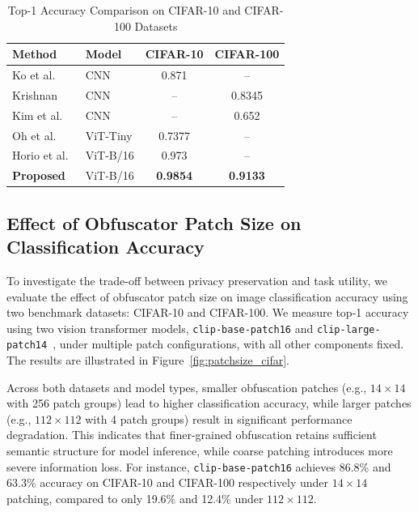 \documentclass{ieeeaccess}
\newcommand{\rev}[1]{{\color{black}#1}}
\begin{document}
\begin{table}[t!]
\centering
\caption{Top-1 Accuracy Comparison on CIFAR-10 and CIFAR-100 Datasets}
\label{tab:accuracy-comparison}
\begin{tabular}{l l c c}
\toprule
\textbf{Method} & \textbf{Model} & \textbf{CIFAR-10} & \textbf{CIFAR-100} \\
\midrule
Ko et al.~\cite{9129656}       & CNN           & 0.871   & --      \\
Krishnan~\cite{10.1007/978-3-031-37586-6_18}        & CNN           & --      & 0.8345  \\
Kim et al.~\cite{s24103166}      & CNN           & --      & 0.652   \\
Oh et al.~\cite{oh2022differentially}       & ViT-Tiny      & 0.7377  & --      \\
Horio et al.~\cite{horio2024privacypreservingvisiontransformerusing} & ViT-B/16      & 0.973   & --      \\
\rev{\textbf{Proposed}} & \rev{ViT-B/16}    & \rev{\textbf{0.9854}} & \rev{\textbf{0.9133}} \\
\bottomrule
\end{tabular}
\end{table}

\subsection{Effect of Obfuscator Patch Size on Classification Accuracy}
\label{sec:eval:patchsize}

To investigate the trade-off between privacy preservation and task utility, we evaluate the effect of obfuscator patch size on image classification accuracy using two benchmark datasets: CIFAR-10 and CIFAR-100. We measure top-1 accuracy using two vision transformer models, \texttt{clip-base-patch16} and \texttt{clip-large-patch14}~\cite{radford2021learningtransferablevisualmodels}, under multiple patch configurations, with all other components fixed. The results are illustrated in Figure~\ref{fig:patchsize_cifar}.

Across both datasets and model types, smaller obfuscation patches (e.g., $14\times14$ with 256 patch groups) lead to higher classification accuracy, while larger patches (e.g., $112\times112$ with 4 patch groups) result in significant performance degradation. This indicates that finer-grained obfuscation retains sufficient semantic structure for model inference, while coarse patching introduces more severe information loss. For instance, \texttt{clip-base-patch16} achieves 86.8\% and 63.3\% accuracy on CIFAR-10 and CIFAR-100 respectively under $14\times14$ patching, compared to only 19.6\% and 12.4\% under $112\times112$.
\end{document}

